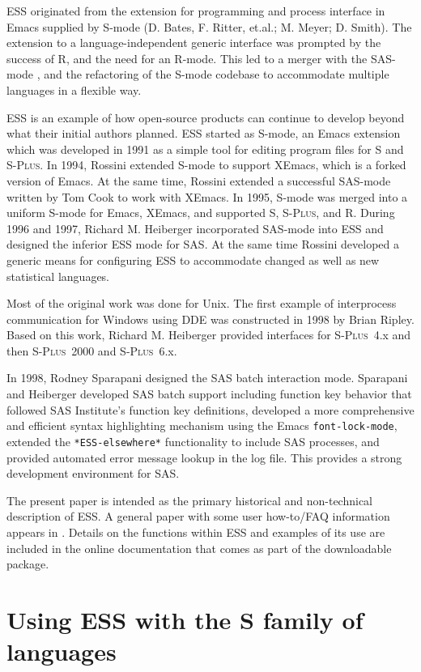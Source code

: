 \documentclass{article}
\newcommand*{\Splus}{\textsc{S-Plus}}
\newcommand{\stexttt}[1]{{\small\texttt{#1}}}
\begin{document}
ESS originated from the extension for programming and process
interface in Emacs supplied by S-mode (D. Bates, F. Ritter, et.al.; M.
Meyer; D. Smith).  The extension to a language-independent generic
interface was prompted by the success of R, and the need for an
R-mode.  This led to a merger with the SAS-mode \cite{SASMODE}, and
the refactoring of the S-mode codebase to accommodate multiple
languages in a flexible way.

ESS is an example of how open-source products can continue to develop
beyond what their initial authors planned.  ESS started as S-mode, an
Emacs extension which was developed in 1991 as a simple tool for
editing program files for S and \Splus.  In 1994, Rossini extended
S-mode to support XEmacs, which is a forked version of Emacs.  At the
same time, Rossini extended a successful SAS-mode written by Tom Cook
to work with XEmacs.  In 1995, S-mode was merged into a uniform S-mode
for Emacs, XEmacs, and supported S, \Splus, and R.  During 1996 and
1997, Richard M. Heiberger incorporated SAS-mode into ESS and designed
the inferior ESS mode for SAS.  At the same time Rossini developed a
generic means for configuring ESS to accommodate changed as well as
new statistical languages.

Most of the original work was done for Unix.  The first example of
interprocess communication for Windows using DDE was constructed in
1998 by Brian Ripley.  Based on this work, Richard M. Heiberger
provided interfaces for \Splus~4.x and then \Splus~2000 and
\Splus~6.x.

In 1998, Rodney Sparapani designed the SAS batch interaction
mode.  Sparapani and Heiberger developed SAS batch support including
function key behavior that followed SAS Institute's function key
definitions, developed a more comprehensive and efficient syntax
highlighting mechanism using the Emacs \stexttt{font-lock-mode},
extended the \stexttt{*ESS-elsewhere*} functionality to include SAS
processes, and provided automated error message lookup in the log
file.  This provides a strong development environment for SAS.


The present paper is intended as the primary historical and
non-technical description of ESS.  A general paper with some user
how-to/FAQ information appears in \citep{heiberger:dsc:2001}.  Details
on the functions within ESS and examples of its use are included in
the online documentation that comes as part of the downloadable
package.

\section{Using ESS with the S family of languages}
\label{sec:S}
\end{document}
